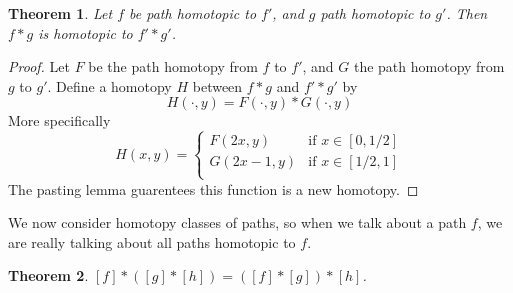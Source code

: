 \documentclass{report}
\theoremstyle{plain}
\newtheorem{theorem}{Theorem}[section]
\theoremstyle{definition}
\begin{document}
\begin{theorem}
    Let $f$ be path homotopic to $f'$, and $g$ path homotopic to $g'$. Then $f * g$ is homotopic to $f' * g'$.
\end{theorem}
\begin{proof}
    Let $F$ be the path homotopy from $f$ to $f'$, and $G$ the path homotopy from $g$ to $g'$. Define a homotopy $H$ between $f * g$ and $f' * g'$ by
    \[ H(\cdot,y) = F(\cdot, y) * G(\cdot, y) \]
    More specifically
    \[ H(x,y) = \begin{cases}
        F(2x,y) & \text{if } x \in [0,1/2]\\
        G(2x - 1,y) & \text{if } x \in [1/2,1]\\
\end{cases} \]
    The pasting lemma guarentees this function is a new homotopy.
\end{proof}

We now consider homotopy classes of paths, so when we talk about a path $f$, we are really talking about all paths homotopic to $f$.

\begin{theorem}
    $[f] * ([g] * [h]) = ([f] * [g]) * [h]$.
\end{theorem}
\end{document}
